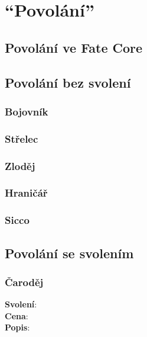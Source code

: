 \chapter{``Povolání''}
\label{chap:speciality}

\section{Povolání ve Fate Core}
\label{sec:povolani-fate-core}

\section{Povolání bez svolení}
\label{sec:pov-bez-svoleni}

\subsection{Bojovník}
\label{sec:pov-bojovnik}

\subsection{Střelec}
\label{sec:pov-strelec}

\subsection{Zloděj}
\label{sec:pov-zlodej}

\subsection{Hraničář}
\label{sec:pov-hranicar}

\subsection{Sicco}
\label{sec:pov-sicco}


\section{Povolání se svolením}
\label{sec:pov-se-svolenim}

\begin{tcolorbox}
\subsection{Čaroděj}
\label{sec:pov-carodej}
\textbf{Svolení}:\\
\textbf{Cena}:\\
\textbf{Popis}:\\
\end{tcolorbox}

